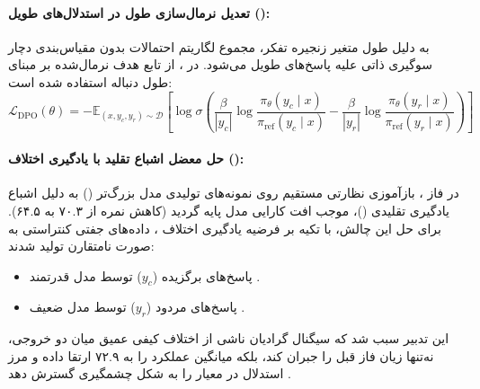 \paragraph*{تعدیل نرمال‌سازی طول در استدلال‌های طویل ():}
به دلیل طول متغیر زنجیره تفکر، مجموع لگاریتم احتمالات بدون مقیاس‌بندی دچار سوگیری ذاتی علیه پاسخ‌های طویل می‌شود. در ، از تابع هدف نرمال‌شده بر مبنای طول دنباله استفاده شده است:
\begin{equation}
    \mathcal{L}_{\text{DPO}}(\theta) = -\mathbb{E}_{(x, y_c, y_r) \sim \mathcal{D}} \left[ \log \sigma \left( \frac{\beta}{|y_c|} \log \frac{\pi_\theta(y_c \mid x)}{\pi_{\text{ref}}(y_c \mid x)} - \frac{\beta}{|y_r|} \log \frac{\pi_\theta(y_r \mid x)}{\pi_{\text{ref}}(y_r \mid x)} \right) \right]
\end{equation}

\paragraph*{حل معضل اشباع تقلید با یادگیری اختلاف ():}
در فاز ، بازآموزی نظارتی مستقیم روی نمونه‌های تولیدی مدل بزرگ‌تر () به دلیل اشباع یادگیری تقلیدی ()، موجب افت کارایی مدل پایه گردید (کاهش نمره از ۷۰.۳ به ۶۴.۵). برای حل این چالش، با تکیه بر فرضیه یادگیری اختلاف \cite{geng2025delta}، داده‌های جفتی کنتراستی به صورت نامتقارن تولید شدند:
\begin{itemize}
    \item پاسخ‌های برگزیده ($y_c$) توسط مدل قدرتمند .
    \item پاسخ‌های مردود ($y_r$) توسط مدل ضعیف .
\end{itemize}
این تدبیر سبب شد که سیگنال گرادیان ناشی از اختلاف کیفی عمیق میان دو خروجی، نه‌تنها زیان فاز قبل را جبران کند، بلکه میانگین عملکرد را به ۷۲.۹ ارتقا داده و مرز استدلال در معیار  را به شکل چشمگیری گسترش دهد \cite{olmo3}.

